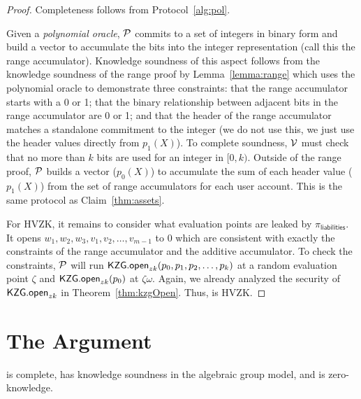 \begin{proof}
Completeness follows from Protocol~\ref{alg:pol}. 

Given a \textit{polynomial oracle}, $\mathcal{P}$ commits to a set of integers in binary form and build a vector to accumulate the bits into the integer representation (call this the range accumulator). Knowledge soundness of this aspect follows from the knowledge soundness of the range proof by Lemma~\ref{lemma:range} which uses the polynomial oracle to demonstrate three constraints: that the range accumulator starts with a 0 or 1; that the binary relationship between adjacent bits in the range accumulator are 0 or 1; and that the header of the range accumulator matches a standalone commitment to the integer (we do not use this, we just use the header values directly from $p_1(X)$). To complete soundness, $\mathcal{V}$ must check that no more than $k$ bits are used for an integer in $[0,k)$. Outside of the range proof, $\mathcal{P}$ builds a vector ($p_0(X)$) to accumulate the sum of each header value ($p_1(X)$) from the set of range accumulators for each user account. This is the same protocol as Claim~\ref{thm:assets}. 

For HVZK, it remains to consider what evaluation points are leaked by $\pi_\mathsf{liabilities}$. It opens $w_1,w_2,w_3,v_1,v_2,\dots,v_{m-1}$ to 0 which are consistent with exactly the constraints of the range accumulator and the additive accumulator. To check the constraints, $\mathcal{P}$ will run $\mathsf{KZG.open}_{zk}(p_0,p_1,p_2,\dots,p_k)$ at a random evaluation point $\zeta$ and $\mathsf{KZG.open}_{zk}(p_0)$ at $\zeta\omega$. Again, we already analyzed the security of $\mathsf{KZG.open}_{zk}$ in Theorem~\ref{thm:kzgOpen}. Thus, \pol is HVZK.
\end{proof}


\section{The \userproof Argument}

\begin{claim}
\label{thm:users} 
\userproof is complete, has knowledge soundness in the algebraic group model, and is zero-knowledge. 
\end{claim}

